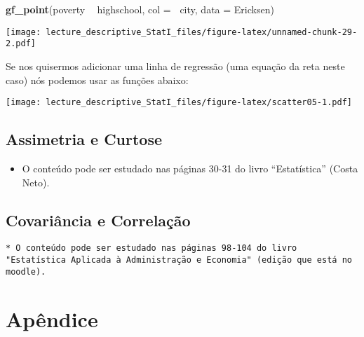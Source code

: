 \documentclass[]{article}
\newenvironment{Shaded}{\begin{snugshade}}{\end{snugshade}}
\newcommand{\KeywordTok}[1]{\textcolor[rgb]{0.13,0.29,0.53}{\textbf{#1}}}
\newcommand{\DataTypeTok}[1]{\textcolor[rgb]{0.13,0.29,0.53}{#1}}
\newcommand{\StringTok}[1]{\textcolor[rgb]{0.31,0.60,0.02}{#1}}
\newcommand{\OperatorTok}[1]{\textcolor[rgb]{0.81,0.36,0.00}{\textbf{#1}}}
\newcommand{\NormalTok}[1]{#1}
\providecommand{\tightlist}{%
  \setlength{\itemsep}{0pt}\setlength{\parskip}{0pt}}
\begin{document}
\begin{Shaded}
\begin{Highlighting}[]
\KeywordTok{gf_point}\NormalTok{(poverty }\OperatorTok{~}\StringTok{ }\NormalTok{highschool, }\DataTypeTok{col =} \OperatorTok{~}\NormalTok{city, }\DataTypeTok{data =}\NormalTok{ Ericksen)}
\end{Highlighting}
\end{Shaded}

\texttt{[image: lecture\_descriptive\_StatI\_files/figure-latex/unnamed-chunk-29-2.pdf]}

Se nos quisermos adicionar uma linha de regressão (uma equação da reta
neste caso) nós podemos usar as funções abaixo:

\begin{Shaded}
\end{Shaded}

\texttt{[image: lecture\_descriptive\_StatI\_files/figure-latex/scatter05-1.pdf]}

\subsection{Assimetria e Curtose}\label{assimetria-e-curtose}

\begin{itemize}
\tightlist
\item
  O conteúdo pode ser estudado nas páginas 30-31 do livro
  ``Estatística'' (Costa Neto).
\end{itemize}

\subsection{Covariância e Correlação}\label{covariancia-e-correlacao}

\begin{verbatim}
* O conteúdo pode ser estudado nas páginas 98-104 do livro "Estatística Aplicada à Administração e Economia" (edição que está no moodle).
\end{verbatim}

\section{Apêndice}\label{apendice}
\end{document}
